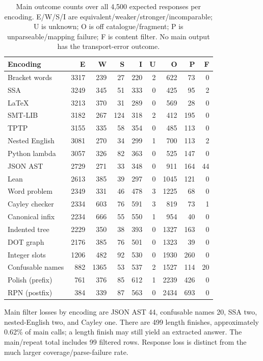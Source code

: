 \documentclass{article}
\newcommand{\pct}{\%}
\begin{document}
\begin{table}[h]
\centering
\small
\caption{Main outcome counts over all 4,500 expected responses per encoding.
E/W/S/I are equivalent/weaker/stronger/incomparable; U is unknown;
O is off catalogue/fragment; P is unparseable/mapping failure; F is content
filter. No main output has the transport-error outcome.}
\begin{tabular}{lrrrrrrrr}
\toprule
Encoding & E & W & S & I & U & O & P & F \\
\midrule
Bracket words & 3317 & 239 & 27 & 220 & 2 & 622 & 73 & 0 \\
SSA & 3249 & 345 & 51 & 333 & 0 & 425 & 95 & 2 \\
LaTeX & 3213 & 370 & 31 & 289 & 0 & 569 & 28 & 0 \\
SMT-LIB & 3182 & 267 & 124 & 318 & 2 & 412 & 195 & 0 \\
TPTP & 3155 & 335 & 58 & 354 & 0 & 485 & 113 & 0 \\
Nested English & 3081 & 270 & 34 & 299 & 1 & 700 & 113 & 2 \\
Python lambda & 3057 & 326 & 82 & 363 & 0 & 525 & 147 & 0 \\
JSON AST & 2729 & 271 & 33 & 348 & 0 & 911 & 164 & 44 \\
Lean & 2613 & 385 & 39 & 297 & 0 & 1045 & 121 & 0 \\
Word problem & 2349 & 331 & 46 & 478 & 3 & 1225 & 68 & 0 \\
Cayley checker & 2334 & 603 & 76 & 591 & 3 & 819 & 73 & 1 \\
Canonical infix & 2234 & 666 & 55 & 550 & 1 & 954 & 40 & 0 \\
Indented tree & 2229 & 350 & 38 & 393 & 0 & 1327 & 163 & 0 \\
DOT graph & 2176 & 385 & 76 & 501 & 0 & 1323 & 39 & 0 \\
Integer slots & 1206 & 482 & 92 & 530 & 0 & 1930 & 260 & 0 \\
Confusable names & 882 & 1365 & 53 & 537 & 2 & 1527 & 114 & 20 \\
Polish (prefix) & 761 & 376 & 85 & 612 & 1 & 2239 & 426 & 0 \\
RPN (postfix) & 384 & 339 & 87 & 563 & 0 & 2434 & 693 & 0 \\
\bottomrule
\end{tabular}
\end{table}

Main filter losses by encoding are JSON AST 44, confusable names 20, SSA two,
nested-English two, and Cayley one. There are 499 length finishes, approximately
0.62\pct{} of main calls; a length finish may still yield an extracted answer.
The main/repeat total includes 99 filtered rows. Response loss is distinct from
the much larger coverage/parse-failure rate.
\end{document}
